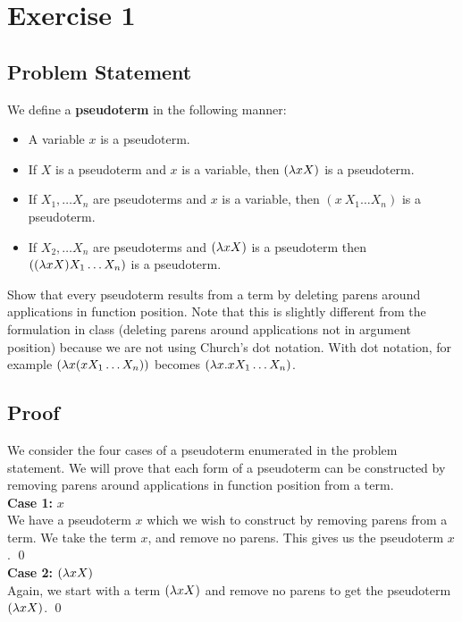 \chapter{Exercise 1}
\lhead{\today}

\section{Problem Statement}
We define a \textbf{pseudoterm} in the following manner:
\begin{itemize}
  \item A variable $x$ is a pseudoterm.
  \item If $X$ is a pseudoterm and $x$ is a variable, then $(\lambda xX)$ is a pseudoterm.
  \item If $X_1, \ldots X_n$ are pseudoterms and $x$ is a variable, then $(x\ X_1 \ldots X_n)$ is a pseudoterm.
  \item If $X_2, \ldots X_n$ are pseudoterms and $(\lambda xX)$ is a pseudoterm then $((\lambda xX) X_1 \ldots X_n)$ is a pseudoterm.
\end{itemize}
Show that every pseudoterm results from a term by deleting parens around applications in function position. Note that this is slightly different from the formulation in class (deleting parens around applications not in argument position) because we are not using Church's dot notation. With dot notation, for example $(\lambda x (x X_1 \ldots X_n))$ becomes $(\lambda x . x X_1 \ldots X_n)$.

\section{Proof}
We consider the four cases of a pseudoterm enumerated in the problem statement. We will prove that each form of a pseudoterm can be constructed by removing parens around applications in function position from a term.\\

\textbf{Case 1:} $x$\\
We have a pseudoterm $x$ which we wish to construct by removing parens from a term. We take the term $x$, and remove no parens. This gives us the pseudoterm $x$. \qed\\

\textbf{Case 2:} $(\lambda xX)$\\
Again, we start with a term $(\lambda xX)$ and remove no parens to get the pseudoterm $(\lambda xX)$. \qed\\

